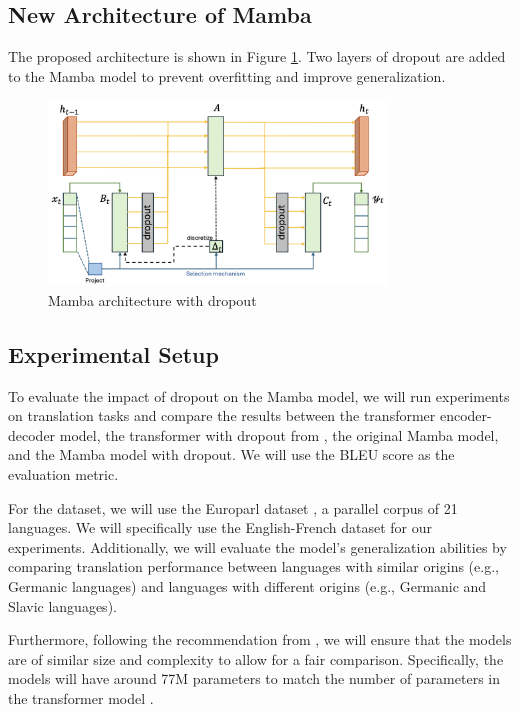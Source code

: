 \documentclass[onecolumn]{IEEEtran}
\begin{document}
\subsection{New Architecture of Mamba}
The proposed architecture is shown in Figure \ref{fig:mamba_dropout}. Two layers of dropout are added to the Mamba model to prevent overfitting and improve generalization.


\begin{figure}[H]
    \centering
    \includegraphics[width=0.8\textwidth]{images/mamba_architecture_dropout.png}
    \caption{Mamba architecture with dropout}
    \label{fig:mamba_dropout}
\end{figure}

\subsection{Experimental Setup}
To evaluate the impact of dropout on the Mamba model, we will run experiments on translation tasks and compare the results between the transformer encoder-decoder model, the transformer with dropout from \cite{escolano2024residual}, the original Mamba model, and the Mamba model with dropout. We will use the BLEU score as the evaluation metric.

For the dataset, we will use the Europarl dataset \cite{koehn2005europarl}, a parallel corpus of 21 languages. We will specifically use the English-French dataset for our experiments. Additionally, we will evaluate the model's generalization abilities by comparing translation performance between languages with similar origins (e.g., Germanic languages) and languages with different origins (e.g., Germanic and Slavic languages).

Furthermore, following the recommendation from \cite{pitorro2024effectivestatespacemodels}, we will ensure that the models are of similar size and complexity to allow for a fair comparison. Specifically, the models will have around 77M parameters to match the number of parameters in the transformer model \cite{pitorro2024effectivestatespacemodels}.
\end{document}
